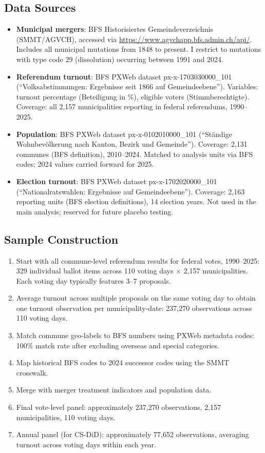 \documentclass[12pt]{article}
\begin{document}
\subsection{Data Sources}

\begin{itemize}
    \item \textbf{Municipal mergers}: BFS Historisiertes Gemeindeverzeichnis (SMMT/AGVCH), accessed via \url{https://www.agvchapp.bfs.admin.ch/api/}. Includes all municipal mutations from 1848 to present. I restrict to mutations with type code 29 (dissolution) occurring between 1991 and 2024.
    \item \textbf{Referendum turnout}: BFS PXWeb dataset px-x-1703030000\_101 (``Volksabstimmungen: Ergebnisse seit 1866 auf Gemeindeebene''). Variables: turnout percentage (Beteiligung in \%), eligible voters (Stimmberechtigte). Coverage: all 2,157 municipalities reporting in federal referendums, 1990--2025.
    \item \textbf{Population}: BFS PXWeb dataset px-x-0102010000\_101 (``St\"{a}ndige Wohnbev\"{o}lkerung nach Kanton, Bezirk und Gemeinde''). Coverage: 2,131 communes (BFS definition), 2010--2024. Matched to analysis units via BFS codes; 2024 values carried forward for 2025.
    \item \textbf{Election turnout}: BFS PXWeb dataset px-x-1702020000\_101 (``Nationalratswahlen: Ergebnisse auf Gemeindeebene''). Coverage: 2,163 reporting units (BFS election definitions), 14 election years. Not used in the main analysis; reserved for future placebo testing.
\end{itemize}

\subsection{Sample Construction}

\begin{enumerate}
    \item Start with all commune-level referendum results for federal votes, 1990--2025: 329 individual ballot items across 110 voting days $\times$ 2,157 municipalities. Each voting day typically features 3--7 proposals.
    \item Average turnout across multiple proposals on the same voting day to obtain one turnout observation per municipality-date: 237,270 observations across 110 voting days.
    \item Match commune geo-labels to BFS numbers using PXWeb metadata codes: 100\% match rate after excluding overseas and special categories.
    \item Map historical BFS codes to 2024 successor codes using the SMMT crosswalk.
    \item Merge with merger treatment indicators and population data.
    \item Final vote-level panel: approximately 237,270 observations, 2,157 municipalities, 110 voting days.
    \item Annual panel (for CS-DiD): approximately 77,652 observations, averaging turnout across voting days within each year.
\end{enumerate}
\end{document}
